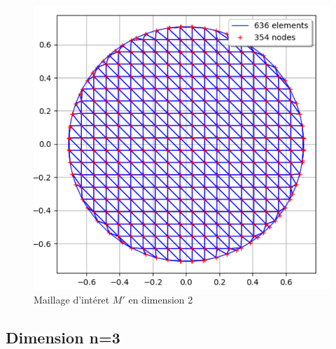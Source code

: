 \begin{figure}[h]
\begin{center}
\includegraphics[scale=0.5]{images/meshP1Dim2-750.pdf}
\caption{Maillage d'intéret $M'$ en dimension 2}
\label{maillageInteretDim2}  
\end{center}
\end{figure}


\subsection{Dimension n=3}

